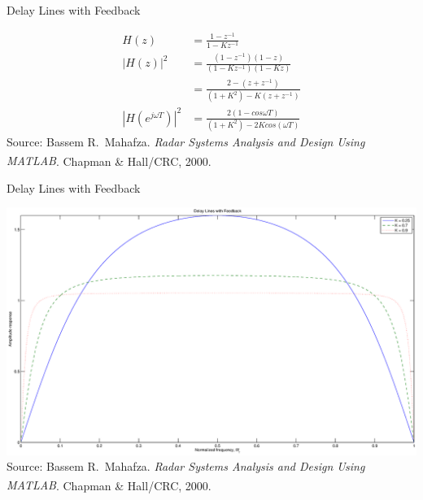 \documentclass[mathserif]{beamer}
\begin{document}
    
    
    \begin{frame}{Delay Lines with Feedback}
      \begin{minipage}[t][0.8\textheight][t]{\textwidth}
	\begin{align}
	  H(z) & = \frac{1 - z^{-1}}{1-Kz^{-1}} \nonumber \\
	  |H(z)|^2 & = \frac{(1-z^{-1})(1-z)}{(1-Kz^{-1})(1-Kz)} \nonumber \\
	  & = \frac{2-(z+z^{-1})}{(1+K^2)-K(z+z^{-1})} \nonumber \\
	  \left|{H(e^{j\omega T})}\right|^2 & = \frac{2(1-cos\omega T)}{(1+K^2)-2Kcos(\omega T)} \nonumber
	\end{align}
	\vfill
	\tiny{Source: Bassem R.~Mahafza. \emph{Radar Systems Analysis and Design Using MATLAB\textsuperscript{\textregistered}}. Chapman \& Hall/CRC, 2000.}
      \end{minipage}
    \end{frame}
    
    
    \begin{frame}{Delay Lines with Feedback}
      \begin{minipage}[t][0.8\textheight][t]{\textwidth}
	\includegraphics[width=\linewidth]{dlFeedback} \\
	\vfill
	\tiny{Source: Bassem R.~Mahafza. \emph{Radar Systems Analysis and Design Using MATLAB\textsuperscript{\textregistered}}. Chapman \& Hall/CRC, 2000.}
      \end{minipage}
    \end{frame}
   
\end{document}
